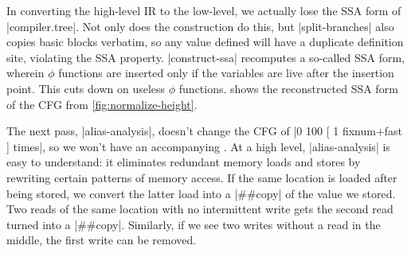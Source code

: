 
In converting the high-level \gls{IR} to the low-level, we actually lose the
\gls{SSA} form of \factor|compiler.tree|.  Not only does the construction do
this, but \factor|split-branches| also copies basic blocks verbatim, so any
value defined will have a duplicate definition site, violating the \gls{SSA}
property.  \factor|construct-ssa| recomputes a so-called 
\gls{SSA} form, wherein $\phi$ functions are inserted only if the variables are
live after the insertion point.  This cuts down on useless $\phi$ 
%
functions.
%
 shows the reconstructed \gls{SSA} form of the
\gls{CFG} from \vref{fig:normalize-height}.

The next pass, \factor|alias-analysis|, doesn't change the \gls{CFG} of
%
\factor|0 100 [ 1 fixnum+fast ] times|,
%
so we won't have an accompanying .  At a high
level, \factor|alias-analysis| is easy to understand: it eliminates redundant
memory loads and stores by rewriting certain patterns of memory access.  If the
same location is loaded after being stored, we convert the latter load into a
\factor|##copy| of the value we stored.  Two reads of the same location with no
intermittent write gets the second read turned into a \factor|##copy|.
Similarly, if we see two writes without a read in the middle, the first write
can be removed.


